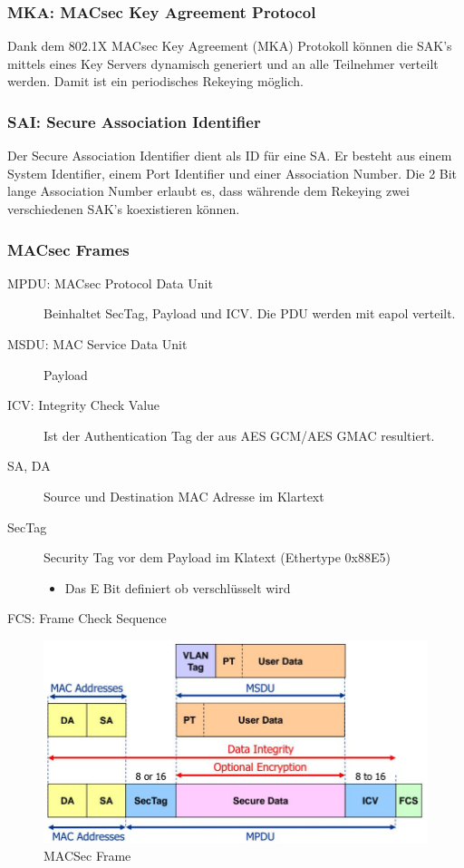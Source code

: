 \subsubsection{MKA: MACsec Key Agreement Protocol}
Dank dem 802.1X MACsec Key Agreement (MKA) Protokoll
können die SAK's mittels eines Key Servers dynamisch generiert und an alle Teilnehmer verteilt werden. Damit ist ein periodisches Rekeying möglich.

\subsubsection{SAI: Secure Association Identifier}
Der Secure Association Identifier dient als ID für eine SA. Er besteht aus einem System Identifier, einem Port Identifier und einer Association Number. Die 2 Bit lange Association Number erlaubt es, dass währende dem Rekeying zwei verschiedenen SAK's koexistieren können.

\subsubsection{MACsec Frames}
\begin{description}
	\item[MPDU: MACsec Protocol Data Unit] Beinhaltet SecTag, Payload und ICV. Die PDU werden mit \gls{eapol} verteilt.
	\item[MSDU: MAC Service Data Unit] Payload
	\item[ICV: Integrity Check Value] Ist der Authentication Tag der aus AES GCM/AES GMAC resultiert.
	\item[SA, DA] Source und Destination MAC Adresse im Klartext
	\item[SecTag] Security Tag vor dem Payload  im Klatext (Ethertype 0x88E5)
	\begin{itemize}
		\item Das E Bit definiert ob verschlüsselt wird
	\end{itemize}
	\item[FCS: Frame Check Sequence] 
\end{description}
\begin{figure}[h]
\centering
\includegraphics[width=0.5\linewidth]{images/macsec_frame_format}
\caption{MACSec Frame}
\label{fig:macsecframeformat}
\end{figure}


